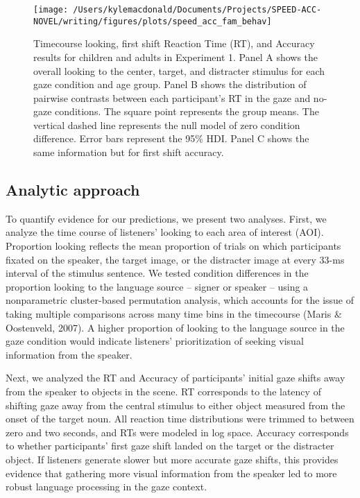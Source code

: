\documentclass[10pt, letterpaper]{article}
\newenvironment{CodeChunk}{}{}
\begin{document}
\begin{CodeChunk}
\begin{figure*}[t]

{\centering \texttt{[image: /Users/kylemacdonald/Documents/Projects/SPEED-ACC-NOVEL/writing/figures/plots/speed\_acc\_fam\_behav]} 

}

\caption[Timecourse looking, first shift Reaction Time (RT), and Accuracy results for children and adults in Experiment 1]{Timecourse looking, first shift Reaction Time (RT), and Accuracy results for children and adults in Experiment 1. Panel A shows the overall looking to the center, target, and distracter stimulus for each gaze condition and age group. Panel B shows the distribution of pairwise contrasts between each participant's RT in the gaze and no-gaze conditions. The square point represents the group means. The vertical dashed line represents the null model of zero condition difference. Error bars represent the 95\% HDI. Panel C shows the same information but for first shift accuracy.}\label{fig:speed-acc-gaze-results}
\end{figure*}
\end{CodeChunk}

\hypertarget{analytic-approach}{%
\subsection{Analytic approach}\label{analytic-approach}}

To quantify evidence for our predictions, we present two analyses.
First, we analyze the time course of listeners' looking to each area of
interest (AOI). Proportion looking reflects the mean proportion of
trials on which participants fixated on the speaker, the target image,
or the distracter image at every 33-ms interval of the stimulus
sentence. We tested condition differences in the proportion looking to
the language source -- signer or speaker -- using a nonparametric
cluster-based permutation analysis, which accounts for the issue of
taking multiple comparisons across many time bins in the timecourse
(Maris \& Oostenveld, 2007). A higher proportion of looking to the
language source in the gaze condition would indicate listeners'
prioritization of seeking visual information from the speaker.

Next, we analyzed the RT and Accuracy of participants' initial gaze
shifts away from the speaker to objects in the scene. RT corresponds to
the latency of shifting gaze away from the central stimulus to either
object measured from the onset of the target noun. All reaction time
distributions were trimmed to between zero and two seconds, and RTs were
modeled in log space. Accuracy corresponds to whether participants'
first gaze shift landed on the target or the distracter object. If
listeners generate slower but more accurate gaze shifts, this provides
evidence that gathering more visual information from the speaker led to
more robust language processing in the gaze context.
\end{document}
